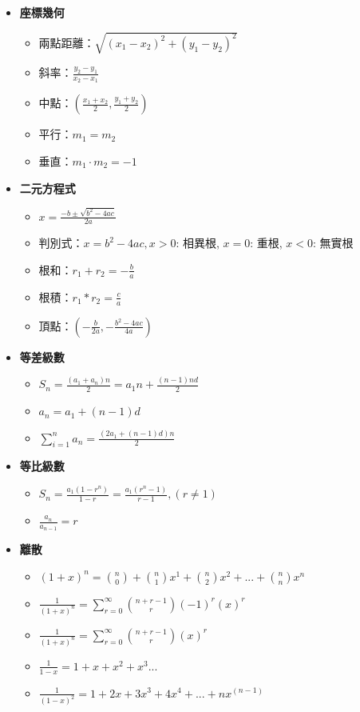 \begin{itemize}
  \item \textbf{座標幾何}
  \begin{itemize}
    \item 兩點距離：$\sqrt{(x_1-x_2)^2+(y_1-y_2)^2}$
    \item 斜率：$\frac{y_2-y_1}{x_2-x_1}$
    \item 中點：$\left(\frac{x_1+x_2}{2}, \frac{y_1+y_2}{2}\right)$
    \item 平行：$m_1 = m_2$
    \item 垂直：$m_1 \cdot m_2 = -1$
  \end{itemize}

  \item \textbf{二元方程式}
  \begin{itemize}
    \item $x = \frac{-b \pm \sqrt{b^2-4ac}}{2a}$
    \item 判別式：$x = b^2-4ac, x>0$: 相異根, $x=0$: 重根, $x<0$: 無實根
    \item 根和：$r_1+r_2 = -\frac{b}{a}$
    \item 根積：$r_1*r_2 = \frac{c}{a}$
    \item 頂點：$(-\frac{b}{2a}, -\frac{b^2-4ac}{4a})$
  \end{itemize}
  
  \item \textbf{等差級數}
  \begin{itemize}
    \item $S_n = \frac{(a_1 + a_n)n}{2} = a_1n + \frac{(n-1)nd}{2}$
    \item $a_n = a_1 + (n-1)d$
    \item $\sum \limits_{i=1}^n a_n = \frac{(2a_1+(n-1)d)n}{2}$
  \end{itemize}
  
  \item \textbf{等比級數}
  \begin{itemize}
    \item $S_n = \frac{a_1(1-r^n)}{1-r} = \frac{a_1(r^n-1)}{r-1}, (r \neq 1)$
    \item $\frac{a_n}{a_{n-1}} = r$
  \end{itemize}

  \item \textbf{離散}
  \begin{itemize}
    \item $(1+x)^n = \binom{n}{0} + \binom{n}{1}x^1 + \binom{n}{2}x^2 + ... + \binom{n}{n}x^n$
    \item $\frac{1}{(1+x)^n} = \sum \limits_{r=0}^\infty \binom{n+r-1}{r}(-1)^r(x)^r$
    \item $\frac{1}{(1+x)^n} = \sum \limits_{r=0}^\infty \binom{n+r-1}{r}(x)^r$
    \item $\frac{1}{1-x} = 1+x+x^2+x^3...$
    \item $\frac{1}{(1-x)^2} = 1+2x+3x^3+4x^4+...+nx^(n-1)$
  \end{itemize}


\end{itemize}
